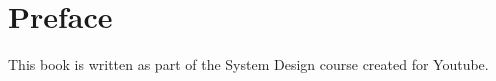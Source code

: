 \chapter*{Preface} 
{}
This book is written as part of the System Design course created for Youtube.